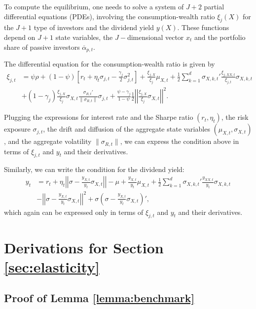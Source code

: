 To compute the equilibrium, one needs to solve a system of $J+2$ partial differential equations (PDEs), involving the consumption-wealth ratio $\xi_{j}(X)$ %
for the $J+1$ type of investors and the dividend yield $y(X)$. %
These functions depend on $J+1$ state variables, the $J-$dimensional vector $x_{t}$ and the portfolio share of passive investors $\overline{\alpha}_{p,t}$.

The differential equation for the consumption-wealth ratio is given by
\begin{align}
    \xi_{j,t} &= \psi \rho + (1-\psi) \left[ r_t + \eta_t \sigma_{j,t} - \frac{\gamma_j}{2} \sigma_{j,t}^2 \right] + \frac{\xi_{j,X}}{\xi_j} \mu_{X,t} + \frac{1}{2} \sum_{k=1}^d \sigma_{X,k,t}' \frac{\xi_{j,XX,t}}{\xi_{j,t}} \sigma_{X,k,t}\nonumber\\
    &+ (1-\gamma_j)  \frac{\xi_{j,X}}{\xi_j} \sigma_{X,t} \frac{\sigma_{R,t}'}{\|\sigma_{R,t}\|} \sigma_{j,t} + \frac{\psi - \gamma_j}{1-\psi} \frac{1}{2} \left|\left| \frac{\xi_{j,X}}{\xi_j} \sigma_{X,t}\right|\right|^2.
\end{align}

Plugging the expressions for interest rate and the Sharpe ratio $(r_t, \eta_t)$, the risk exposure $\sigma_{j,t}$, the drift and diffusion of the aggregate state variables $(\mu_{X,t}, \sigma_{X,t})$, and the aggregate volatility $\|\sigma_{R,t}\|$, we can express the condition above in terms of $\xi_{j,t}$ and $y_t$ and their derivatives. 

Similarly, we can write the condition for the dividend yield:
\begin{align}
    y_t &= r_t + \eta_t \left|\left|\sigma - \frac{y_{X,t}}{y_t} \sigma_{X,t}\right|\right| -\mu + \frac{y_{X,t}}{y_t} \mu_{X,t} + \frac{1}{2} \sum_{k=1}^d \sigma_{X,k,t}' \frac{y_{XX,t}}{y_{t}} \sigma_{X,k,t}\nonumber\\
    &
    - \left|\left|\sigma - \frac{y_{X,t}}{y_t} \sigma_{X,t}\right|\right|^2+ \sigma \left(\sigma - \frac{y_{X,t}}{y_t} \sigma_{X,t} \right)',
\end{align}
which again can be expressed only in terms of $\xi_{j,t}$ and $y_t$ and their derivatives. 

\section{Derivations for Section \ref{sec:elasticity}}

\subsection{Proof of Lemma \ref{lemma:benchmark}}\label{app:lemma1}

